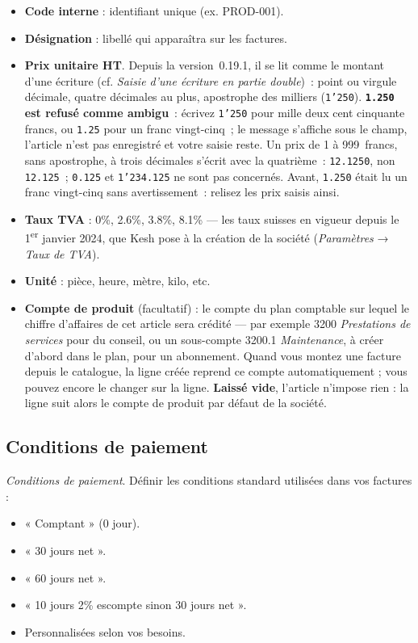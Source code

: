 \documentclass[a4paper,11pt,oneside]{article}
\begin{document}
\begin{itemize}
    \item \textbf{Code interne} : identifiant unique (ex. PROD-001).
    \item \textbf{Désignation} : libellé qui apparaîtra sur les factures.
    \item \textbf{Prix unitaire HT}. Depuis la version~0.19.1, il se lit comme le montant d'une écriture (cf. \emph{Saisie d'une écriture en partie double})~: point ou virgule décimale, quatre décimales au plus, apostrophe des milliers (\texttt{1'250}). \textbf{\texttt{1.250} est refusé comme ambigu}~: écrivez \texttt{1'250} pour mille deux cent cinquante francs, ou \texttt{1.25} pour un franc vingt-cinq~; le message s'affiche sous le champ, l'article n'est pas enregistré et votre saisie reste. Un prix de 1 à 999~francs, sans apostrophe, à trois décimales s'écrit avec la quatrième~: \texttt{12.1250}, non \texttt{12.125}~; \texttt{0.125} et \texttt{1'234.125} ne sont pas concernés. Avant, \texttt{1.250} était lu un franc vingt-cinq sans avertissement~: relisez les prix saisis ainsi.
    \item \textbf{Taux TVA} : 0\%, 2.6\%, 3.8\%, 8.1\% --- les taux suisses en vigueur depuis le 1\textsuperscript{er} janvier 2024, que Kesh pose à la création de la société (\emph{Paramètres} → \emph{Taux de TVA}).
    \item \textbf{Unité} : pièce, heure, mètre, kilo, etc.
    \item \textbf{Compte de produit} (facultatif) : le compte du plan comptable sur lequel le chiffre d'affaires de cet article sera crédité — par exemple 3200 \emph{Prestations de services} pour du conseil, ou un sous-compte 3200.1 \emph{Maintenance}, à créer d'abord dans le plan, pour un abonnement. Quand vous montez une facture depuis le catalogue, la ligne créée reprend ce compte automatiquement ; vous pouvez encore le changer sur la ligne. \textbf{Laissé vide}, l'article n'impose rien : la ligne suit alors le compte de produit par défaut de la société.
\end{itemize}

\subsection{Conditions de paiement}

\emph{Conditions de paiement}. Définir les conditions standard utilisées dans vos factures :

\begin{itemize}
    \item « Comptant » (0 jour).
    \item « 30 jours net ».
    \item « 60 jours net ».
    \item « 10 jours 2\% escompte sinon 30 jours net ».
    \item Personnalisées selon vos besoins.
\end{itemize}
\end{document}
